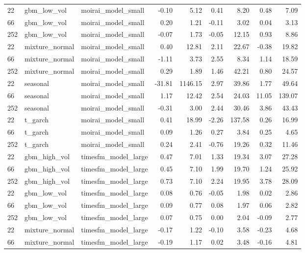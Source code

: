 {\begin{tabular}{lllrrrrrr}
\midrule
22 & gbm\_low\_vol & moirai\_model\_small & -0.10 & 5.12 & 0.41 & 8.20 & 0.48 & 7.09 \\
66 & gbm\_low\_vol & moirai\_model\_small & 0.20 & 1.21 & -0.11 & 3.02 & 0.04 & 3.13 \\
252 & gbm\_low\_vol & moirai\_model\_small & -0.07 & 1.73 & -0.05 & 12.15 & 0.93 & 8.86 \\
\midrule
22 & mixture\_normal & moirai\_model\_small & 0.40 & 12.81 & 2.11 & 22.67 & -0.38 & 19.82 \\
66 & mixture\_normal & moirai\_model\_small & -1.11 & 3.73 & 2.55 & 8.34 & 1.14 & 18.59 \\
252 & mixture\_normal & moirai\_model\_small & 0.29 & 1.89 & 1.46 & 42.21 & 0.80 & 24.57 \\
\midrule
22 & seasonal & moirai\_model\_small & -31.81 & 1146.15 & 2.97 & 39.86 & 1.77 & 49.64 \\
66 & seasonal & moirai\_model\_small & 1.17 & 12.42 & 2.54 & 24.03 & 11.05 & 139.07 \\
252 & seasonal & moirai\_model\_small & -0.31 & 3.00 & 2.44 & 30.46 & 3.86 & 43.43 \\
\midrule
22 & t\_garch & moirai\_model\_small & 0.41 & 18.99 & -2.26 & 137.58 & 0.26 & 16.99 \\
66 & t\_garch & moirai\_model\_small & 0.09 & 1.26 & 0.27 & 3.84 & 0.25 & 4.65 \\
252 & t\_garch & moirai\_model\_small & 0.24 & 2.41 & -0.76 & 19.26 & 0.32 & 11.46 \\
\midrule
22 & gbm\_high\_vol & timesfm\_model\_large & 0.47 & 7.01 & 1.33 & 19.34 & 3.07 & 27.28 \\
66 & gbm\_high\_vol & timesfm\_model\_large & 0.45 & 7.10 & 1.99 & 19.70 & 1.24 & 25.92 \\
252 & gbm\_high\_vol & timesfm\_model\_large & 0.73 & 7.10 & 2.24 & 19.95 & 3.78 & 28.09 \\
\midrule
22 & gbm\_low\_vol & timesfm\_model\_large & 0.08 & 0.76 & -0.05 & 1.98 & 0.02 & 2.86 \\
66 & gbm\_low\_vol & timesfm\_model\_large & 0.09 & 0.77 & 0.08 & 1.97 & 0.06 & 2.82 \\
252 & gbm\_low\_vol & timesfm\_model\_large & 0.07 & 0.75 & 0.00 & 2.04 & -0.09 & 2.77 \\
\midrule
22 & mixture\_normal & timesfm\_model\_large & -0.17 & 1.22 & -0.10 & 3.58 & -0.23 & 4.68 \\
66 & mixture\_normal & timesfm\_model\_large & -0.19 & 1.17 & 0.02 & 3.48 & -0.16 & 4.81 \\

\end{tabular}}
